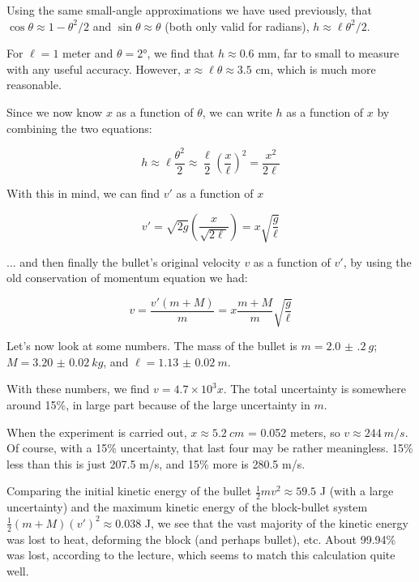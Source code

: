 Using the same small-angle approximations we have used previously, that $\displaystyle \cos \theta \approx 1 - \theta^2/2$ and $\sin \theta \approx \theta$ (both only valid for radians), $\displaystyle h \approx \ell \theta^2/2$.

For $\ell = 1$ meter and $\theta = \ang{2}$, we find that $h \approx 0.6$ mm, far to small to measure with any useful accuracy. However, $x \approx \ell \theta \approx 3.5$ cm, which is much more reasonable. 

Since we now know $x$ as a function of $\theta$, we can write $h$ as a function of $x$ by combining the two equations:

\begin{equation}
h \approx \ell \frac{\theta^2}{2} \approx \frac{\ell}{2} \left(\frac{x}{\ell}\right)^2 = \frac{x^2}{2 \ell}
\end{equation}

With this in mind, we can find $v'$ as a function of $x$

\begin{equation}
v' = \sqrt{2 g} (\frac{x}{\sqrt{2 \ell}}) = x \sqrt{\frac{g}{\ell}}
\end{equation}

... and then finally the bullet's original velocity $v$ as a function of $v'$, by using the old conservation of momentum equation we had:

\begin{equation}
v = \frac{v'(m + M)}{m} = x \frac{m + M}{m} \sqrt{\frac{g}{\ell}}
\end{equation}

Let's now look at some numbers. The mass of the bullet is $m = \SI{2.0(2)}{g}$; $M = \SI{3.20(2)}{kg}$, and $\ell = \SI{1.13(2)}{m}$.

With these numbers, we find $v = 4.7 \times 10^{3} x$. The total uncertainty is somewhere around 15\%, in large part because of the large uncertainty in $m$.

When the experiment is carried out, $x \approx \SI{5.2}{cm}$ = 0.052 meters, so $v \approx \SI{244}{m/s}$. Of course, with a 15\% uncertainty, that last four may be rather meaningless. 15\% less than this is just 207.5 m/s, and 15\% more is 280.5 m/s.

Comparing the initial kinetic energy of the bullet $\displaystyle \frac{1}{2} m v^2 \approx 59.5$ J (with a large uncertainty) and the maximum kinetic energy of the block-bullet system $\displaystyle \frac{1}{2} (m + M) (v')^2 \approx 0.038$ J, we see that the vast majority of the kinetic energy was lost to heat, deforming the block (and perhaps bullet), etc. About 99.94\% was lost, according to the lecture, which seems to match this calculation quite well.

